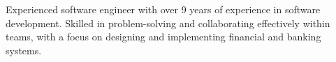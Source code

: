 

\begin{cvparagraph}

    Experienced software engineer with over 9 years of experience in software development.
    Skilled in problem-solving and collaborating effectively within teams, with a focus on designing and implementing financial and banking systems.
\end{cvparagraph}
